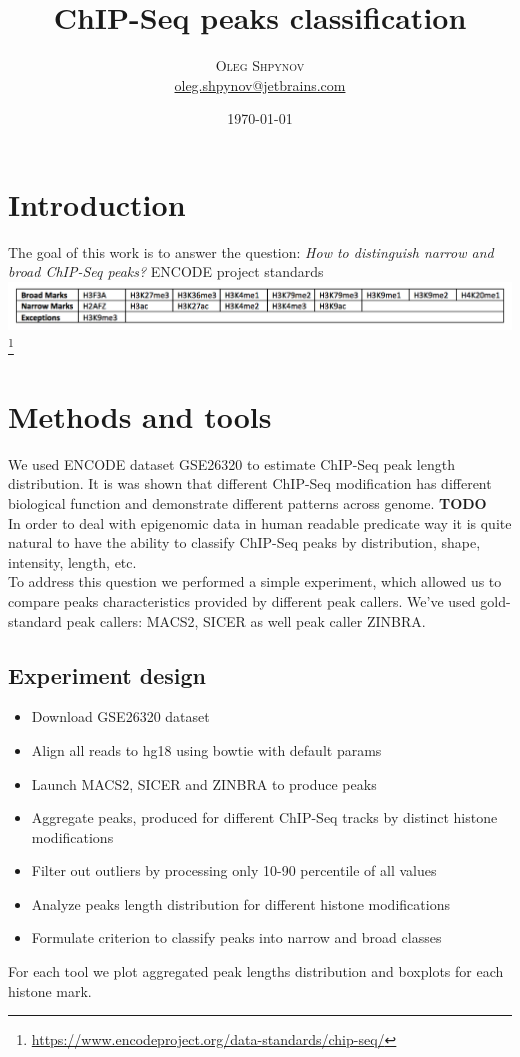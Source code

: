 \documentclass{article}
\title{\vspace{-15mm}\fontsize{24pt}{10pt}\selectfont\textbf{ChIP-Seq peaks classification}} %
\author{
\large
\textsc{Oleg Shpynov}\\
\normalsize \href{mailto:oleg.shpynov@jetbrains.com}{oleg.shpynov@jetbrains.com} %
\vspace{-1mm}
}
\date{\today}
\begin{document}
\maketitle %
\tableofcontents %


\section{Introduction}
The goal of this work is to answer the question:
\textit{How to distinguish narrow and broad ChIP-Seq peaks?}
ENCODE project standards\\
\includegraphics[width=\linewidth]{encodestandards.png}\footnote{\url{https://www.encodeproject.org/data-standards/chip-seq/}}

\section{Methods and tools}
We used ENCODE dataset GSE26320 to estimate ChIP-Seq peak length distribution. It is was shown that different ChIP-Seq modification has different biological function and demonstrate different patterns across genome. \textbf{TODO}\\
In order to deal with epigenomic data in human readable predicate way it is quite natural to have the ability to classify ChIP-Seq peaks by distribution, shape, intensity, length, etc.\\
To address this question we performed a simple experiment, which allowed us to compare peaks characteristics provided by different peak callers. We've used gold-standard peak callers: MACS2, SICER as well peak caller ZINBRA.\\

\subsection{Experiment design}
\begin{itemize}
\item Download GSE26320 dataset
\item Align all reads to hg18 using bowtie with default params
\item Launch MACS2, SICER and ZINBRA to produce peaks
\item Aggregate peaks, produced for different ChIP-Seq tracks by distinct histone modifications
\item Filter out outliers by processing only 10-90 percentile of all values
\item Analyze peaks length distribution for different histone modifications 
\item Formulate criterion to classify peaks into narrow and broad classes
\end{itemize}
For each tool we plot aggregated peak lengths distribution and boxplots for each histone mark.
\end{document}
